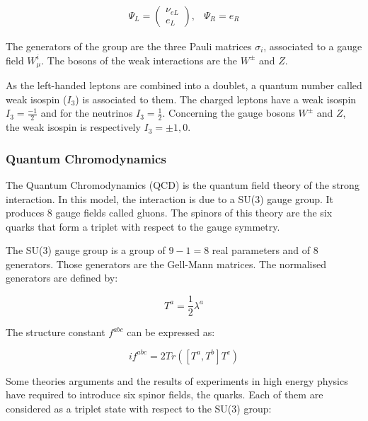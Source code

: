     \begin{equation}
      \begin{array}{cc}
        \Psi_L = 
         \begin{pmatrix}
           \nu_{eL} \\
           e_L
         \end{pmatrix}, & \Psi_R = e_R
      \end{array}
    \end{equation}

    The generators of the group are the three Pauli matrices $\sigma_i$, associated to a gauge field $W_{\mu}^i$.
    The bosons of the weak interactions are the $W^{\pm}$ and $Z$.

    As the left-handed leptons are combined into a doublet, a quantum number called weak isospin ($I_3$) is associated to them.
    The charged leptons have a weak isospin $I_3 = \frac{-1}{2}$ and for the neutrinos $I_3 = \frac{1}{2}$.
    Concerning the gauge bosons $W^{\pm}$ and $Z$, the weak isospin is respectively $I_3 = \pm 1, 0$.
    
    \subsubsection{Quantum Chromodynamics}
    
    The Quantum Chromodynamics (QCD) is the quantum field theory of the strong interaction.
    In this model, the interaction is due to a SU(3) gauge group. 
    It produces 8 gauge fields called gluons.
    The spinors of this theory are the six quarks that form a triplet with respect to the gauge symmetry.

    The SU(3) gauge group is a group of $9 - 1 = 8$ real parameters and of 8 generators. 
    Those generators are the Gell-Mann matrices. 
    The normalised generators are defined by: 
    
    \begin{equation}
        T^a = \frac{1}{2}\lambda^a
    \end{equation}

    The structure constant $f^{abc}$ can be expressed as:

    \begin{equation}
        if^{abc} = 2 Tr([T^a,T^b]T^c)
    \end{equation}
     
    Some theories arguments and the results of experiments in high energy physics have required to introduce six spinor fields, the quarks.
    Each of them are considered as a triplet state with respect to the SU(3) group:

